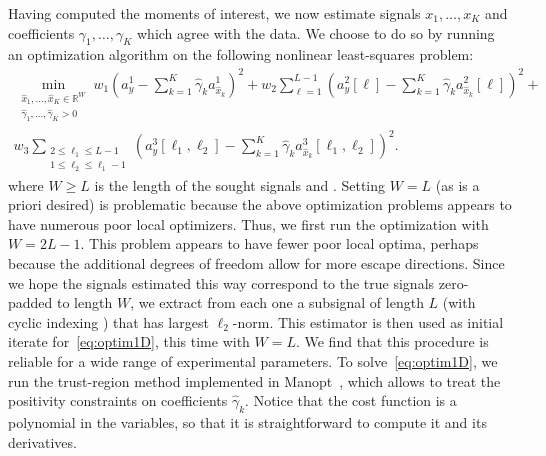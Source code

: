\documentclass[english,11pt]{article}
\newcommand{\TODO}[1]{{\color{red}{[#1]}}}
\numberwithin{equation}{section}
\theoremstyle{plain}
\theoremstyle{definition}
\theoremstyle{remark}
\theoremstyle{plain}
\theoremstyle{remark}
\theoremstyle{plain}
\theoremstyle{plain}
\newcommand{\reals}{\mathbb{R}}
\begin{document}
Having computed the moments of interest, we now estimate signals $x_1, \ldots, x_K$ and coefficients $\gamma_1, \ldots, \gamma_K$ which agree with the data. We choose to do so by running an optimization algorithm on the following nonlinear least-squares problem:
\begin{multline}
	\min_{\substack{\hat x_1, \ldots, \hat x_K \in \reals^{W} \\ \hat \gamma_1, \ldots, \hat \gamma_K > 0}} w_1 \left( a_y^1 - \sum_{k=1}^K \hat \gamma_k a_{\hat x_k}^1 \right)^2 + w_2 \sum_{\ell = 1}^{L-1} \left( a_y^2[\ell] - \sum_{k=1}^K \hat \gamma_k a_{\hat x_k}^2[\ell] \right)^2 + \\ w_3 \sum_{\substack{2\leq\ell_1\leq L-1 \\ 1 \leq \ell_2 \leq \ell_1-1}} \left( a_y^3[\ell_1, \ell_2] - \sum_{k=1}^K \hat \gamma_k a_{\hat x_k}^3[\ell_1,\ell_2] \right)^2.
	\label{eq:optim1D}
\end{multline}
where $W \geq L$ is the length of the sought signals and \TODO{explain $w_i$'s: currently they are $w_1 = 1/2, w_2 = 1/2n_2, w_3 = 1/2n_3$, where $n_2, n_3$ are the number of moments used: $n_2 = L-1$, $n_3 = \frac{(L-1)(L-2)}{2}$. Issue is: this is not very smart..}. Setting $W = L$ (as is a priori desired) is problematic because the above optimization problems appears to have numerous poor local optimizers.
Thus, we first run the optimization with $W = 2L-1$. This problem appears to have fewer poor local optima, perhaps because the additional degrees of freedom allow for more escape directions. Since we hope the signals estimated this way correspond to the true signals zero-padded to length $W$, we extract from each one a subsignal of length $L$ (with cyclic indexing \TODO{we should understand / explain this}) that has largest $\ell_2$-norm. This estimator is then used as initial iterate for~\eqref{eq:optim1D}, this time with $W = L$. We find that this procedure is reliable for a wide range of experimental parameters. To solve~\eqref{eq:optim1D}, we run the trust-region method implemented in Manopt~\cite{manopt}, which allows to treat the positivity constraints \TODO{I might need a reference for this} on coefficients $\hat \gamma_k$. Notice that the cost function is a polynomial in the variables, so that it is straightforward to compute it and its derivatives.
\TODO{Should we do variable projection for the gammas, that is, exploit the fact the problem is a regular least squares in the gammas (up to the positivity constraints) to substitute the explicit optimum for them? Not sure it's worth the effort. -- Ok, it's probably not a good idea, because even with fixed gammas to the correct value, optimization takes a while.}
\TODO{Do we still need to stress at this point that the optimization part has complexity independent of length of observation? Should be pretty clear at this point already.}
\end{document}
